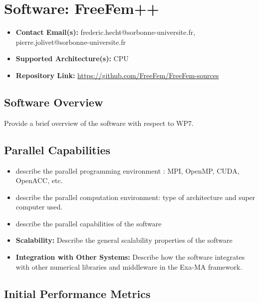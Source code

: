 \section{Software: FreeFem++}
\label{sec:WP7:FreeFem++:software}

\begin{itemize}
    \item \textbf{Contact Email(s):} frederic.hecht@sorbonne-universite.fr, pierre.jolivet@sorbonne-universite.fr
    \item \textbf{Supported Architecture(s):} CPU
    \item \textbf{Repository Link:} \href{https://github.com/FreeFem/FreeFem-sources}{https://github.com/FreeFem/FreeFem-sources}
\end{itemize}

\subsection{Software Overview}
\label{sec:WP7:FreeFem++:summary}

Provide a brief overview of the software with respect to WP7.

\subsection{Parallel Capabilities}
\label{sec:WP7:FreeFem++:performances}


\begin{itemize}
    \item describe the parallel programming  environment : MPI, OpenMP, CUDA, OpenACC, etc.
    \item describe the parallel computation environment: type of architecture and super computer used.
    \item describe the parallel capabilities of the software
    \item \textbf{Scalability:} Describe the general scalability properties of the software
    \item \textbf{Integration with Other Systems:} Describe how the software integrates with other numerical libraries and middleware in the Exa-MA framework.
\end{itemize}

\subsection{Initial Performance Metrics}
\label{sec:WP7:FreeFem++:metrics}

